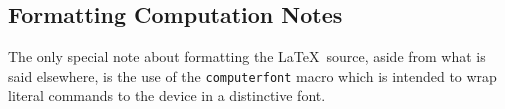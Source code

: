 \documentclass[12pt]{article}
\newcommand{\rawtex}[1]{{\tt#1}}
\begin{document}
\subsection*{Formatting Computation Notes}
%
The only special note about formatting the \LaTeX\ source, aside from what is said elsewhere, is the use of the \rawtex{computerfont} macro which is intended to wrap literal commands to the device in a distinctive font.



\end{document}
